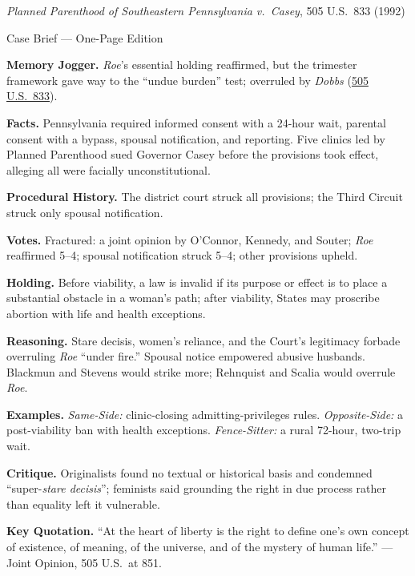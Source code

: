 \documentclass[12pt]{article}
\begin{document}
\begin{center}
{\Large \textit{Planned Parenthood of Southeastern Pennsylvania v.\ Casey}, 505 U.S.\ 833 (1992)\par}
\vspace{0.3em}
{\normalsize Case Brief --- One-Page Edition\par}
\end{center}

\textbf{Memory Jogger.} \textit{Roe}'s essential holding reaffirmed, but the trimester framework gave way to the ``undue burden'' test; overruled by \textit{Dobbs} (\href{https://supreme.justia.com/cases/federal/us/505/833/}{505 U.S.\ 833}).

\textbf{Facts.} Pennsylvania required informed consent with a 24-hour wait, parental consent with a bypass, spousal notification, and reporting. Five clinics led by Planned Parenthood sued Governor Casey before the provisions took effect, alleging all were facially unconstitutional.

\textbf{Procedural History.} The district court struck all provisions; the Third Circuit struck only spousal notification.

\textbf{Votes.} Fractured: a joint opinion by O'Connor, Kennedy, and Souter; \textit{Roe} reaffirmed 5--4; spousal notification struck 5--4; other provisions upheld.

\textbf{Holding.} Before viability, a law is invalid if its purpose or effect is to place a substantial obstacle in a woman's path; after viability, States may proscribe abortion with life and health exceptions.

\textbf{Reasoning.} Stare decisis, women's reliance, and the Court's legitimacy forbade overruling \textit{Roe} ``under fire.'' Spousal notice empowered abusive husbands. Blackmun and Stevens would strike more; Rehnquist and Scalia would overrule \textit{Roe}.

\textbf{Examples.} \emph{Same-Side:} clinic-closing admitting-privileges rules. \emph{Opposite-Side:} a post-viability ban with health exceptions. \emph{Fence-Sitter:} a rural 72-hour, two-trip wait.

\textbf{Critique.} Originalists found no textual or historical basis and condemned ``super-\textit{stare decisis}''; feminists said grounding the right in due process rather than equality left it vulnerable.

\textbf{Key Quotation.} ``At the heart of liberty is the right to define one's own concept of existence, of meaning, of the universe, and of the mystery of human life.'' --- Joint Opinion, 505 U.S.\ at 851.
\end{document}
